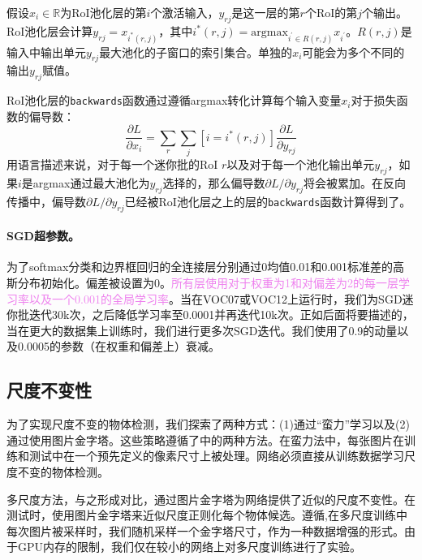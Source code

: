 \documentclass[../main]{subfile}
\begin{document}
假设$x_i \in \mathbb{R}$为RoI池化层的第$i$个激活输入，$y_{rj}$是这一层的第$r$个RoI的第$j$个输出。RoI池化层会计算$y_{rj} = x_{i^*(r, j)}$，其中$i^*(r, j) = \text{argmax}_{i^{'}\in R(r, j)}x_{i^{'}}$。$R(r, j)$是输入中输出单元$y_{rj}$最大池化的子窗口的索引集合。单独的$x_i$可能会为多个不同的输出$y_{rj}$赋值。

RoI池化层的\lstinline{backwards}函数通过遵循argmax转化计算每个输入变量$x_i$对于损失函数的偏导数：
\begin{equation}
    \frac{\partial L}{\partial x_i} = \sum_r \sum_j [i = i^*(r, j)] \frac{\partial L}{\partial y_{rj}}
\end{equation}
用语言描述来说，对于每一个迷你批的RoI $r$以及对于每一个池化输出单元$y_{rj}$，如果$i$是argmax通过最大池化为$y_{rj}$选择的，那么偏导数$\partial L / \partial y_{rj}$将会被累加。在反向传播中，偏导数$\partial L / \partial y_{rj}$已经被RoI池化层之上的层的\lstinline{backwards}函数计算得到了。

\paragraph{SGD超参数。}为了softmax分类和边界框回归的全连接层分别通过0均值0.01和0.001标准差的高斯分布初始化。偏差被设置为0。\textcolor{violet}{所有层使用对于权重为1和对偏差为2的每一层学习率以及一个0.001的全局学习率}。当在VOC07或VOC12上运行时，我们为SGD迷你批迭代30k次，之后降低学习率至0.0001并再迭代10k次。正如后面将要描述的，当在更大的数据集上训练时，我们进行更多次SGD迭代。我们使用了0.9的动量以及0.0005的参数（在权重和偏差上）衰减。

\subsection{尺度不变性}

为了实现尺度不变的物体检测，我们探索了两种方式：(1)通过“蛮力”学习以及(2)通过使用图片金字塔。这些策略遵循了\cite{spp}中的两种方法。在蛮力法中，每张图片在训练和测试中在一个预先定义的像素尺寸上被处理。网络必须直接从训练数据学习尺度不变的物体检测。

多尺度方法，与之形成对比，通过图片金字塔为网络提供了近似的尺度不变性。在测试时，使用图片金字塔来近似尺度正则化每个物体候选。遵循\cite{spp},在多尺度训练中每次图片被采样时，我们随机采样一个金字塔尺寸，作为一种数据增强的形式。由于GPU内存的限制，我们仅在较小的网络上对多尺度训练进行了实验。
\end{document}
